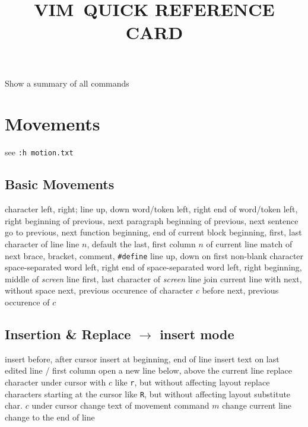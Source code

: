 
\def\content{VIM}
\def\versionnumber{1.3}  %
\def\version{v\versionnumber\ \month\ \year}




\title{\uppercase{\content\ quick reference card}}

\shortintro

\vskip 0.5cm
	{Show a summary of all commands }

\section{Movements}	{see {\tt :h motion.txt}}
\subsection{Basic Movements}{}
	{character left, right; line up, down }
	{word/token left, right }
	{end of word/token left, right}
\cmdS{\lapos\ \rapos }	{beginning of previous, next paragraph}
\cmdS{( ) }	{beginning of previous, next sentence}
\cmdS{[[\ ]]}	{go to previous, next function}
\cmdS{[\lapos\ ]\rapos}	{beginning, end of current block}
	{beginning, first, last character of line}
	{line $n$, default the last, first}
	{column $n$ of current line}
\cmdS{\% }	{match of next brace, bracket, comment, {\tt\#define}}
\cmdS{- + }	{line up, down on first non-blank character}
	{space-separated word left, right}
	{end of space-separated word left, right}
	{beginning, middle of {\it screen\/} line}
	{first, last character of {\it screen\/} line}
	{join current line with next, without space}
	{next, previous occurence of character $c$}
	{before next, previous occurence of $c$}

\subsection{Insertion \& Replace $\to$ insert mode}	{}
	{insert before, after cursor}
	{insert at beginning, end of line}
	{insert text on last edited line / first column}
	{open a new line below, above the current line}
	{replace character under cursor with $c$}
	{like {\tt r}, but without affecting layout}
	{replace characters starting at the cursor}
	{like {\tt R}, but without affecting layout}
	{substitute char. $c$ under cursor}
	{change text of movement command $m$}
	{change current line}
	{change to the end of line}

